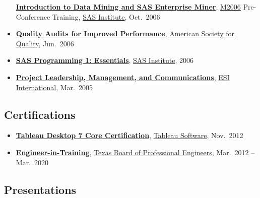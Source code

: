\documentclass[
]{article}
\providecommand{\tightlist}{%
  \setlength{\itemsep}{0pt}\setlength{\parskip}{0pt}}
\begin{document}
\begin{itemize}
  \href{https://web.archive.org/web/20060717222143/http://www.sas.com/events/dmconf/emiw.html}{\textbf{Introduction
  to Data Mining and SAS Enterprise Miner}},
  \href{https://web.archive.org/web/20060824073228/http://www.sas.com/events/dmconf/}{M2006}
  Pre-Conference Training, \href{https://www.sas.com/}{SAS Institute},
  Oct.~2006
\item
  \href{https://asq.org/courses/outlines/quality-audits.html}{\textbf{Quality
  Audits for Improved Performance}},
  \href{https://www.asq.org/}{American Society for Quality}, Jun.~2006
\item
  \href{https://support.sas.com/edu/schedules.html?ctry=us\&id=2588}{\textbf{SAS
  Programming 1: Essentials}}, \href{https://www.sas.com/}{SAS
  Institute}, 2006
\item
  \href{https://www.strategyex.com/explore-our-courses/project-management/project-leadership-management-and-communications}{\textbf{Project
  Leadership, Management, and Communications}},
  \href{https://www.strategyex.com/}{ESI International}, Mar.~2005
\end{itemize}

\hypertarget{certifications}{%
\subsection{Certifications}\label{certifications}}

\begin{itemize}
\tightlist
\item
  \href{https://web.archive.org/web/20170830020228/http://conference.tableausoftware.com/2012/files/TC_StudyGuide.pdf}{\textbf{Tableau
  Desktop 7 Core Certification}},
  \href{https://www.tableau.com/}{Tableau Software}, Nov.~2012
\item
  \href{https://engineers.texas.gov/lic_eit_exinfo.htm}{\textbf{Engineer-in-Training}},
  \href{https://engineers.texas.gov/}{Texas Board of Professional
  Engineers}, Mar.~2012 -- Mar.~2020
\end{itemize}

\hypertarget{presentations}{%
\subsection{Presentations}\label{presentations}}
\end{document}
